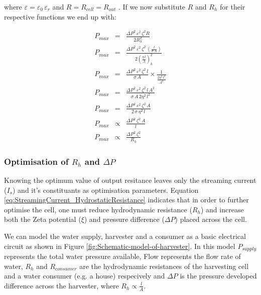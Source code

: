 where $\varepsilon=\varepsilon_{0}\,\varepsilon_{r}$ and $R=R_{cell}=R_{out}$
. If we now substitute $R$ and $R_{h}$ for their respective functions
we end up with:

\begin{eqnarray}
P_{max} & = & \frac{\Delta P^{2}\,\varepsilon^{2}\,\zeta^{2}R}{2R_{h}^{2}}\nonumber \\
P_{max} & = & \frac{\Delta P^{2}\,\varepsilon^{2}\,\zeta^{2}\,\left(\frac{l}{\sigma\, A}\right)}{2\left(\frac{\eta\, l}{A}\right)_{h}^{2}}\nonumber \\
P_{max} & = & \frac{\Delta P^{2}\,\varepsilon^{2}\,\zeta^{2}\, l}{\sigma\, A}\times\frac{1}{\frac{2\eta^{2}\, l^{2}}{A^{2}}}\nonumber \\
P_{max} & = & \frac{\Delta P^{2}\,\varepsilon^{2}\,\zeta^{2}\, l\, A^{2}}{\sigma\, A\,2\eta^{2}\, l^{2}}\nonumber \\
P_{max} & = & \frac{\Delta P^{2}\,\varepsilon^{2}\,\zeta^{2}\, A}{2\,\sigma\,\eta^{2}\, l}\nonumber \\
P_{max} & \propto & \frac{\Delta P^{2}\,\zeta^{2}\, A}{l}\nonumber \\
P_{max} & \propto & \frac{\Delta P^{2}\,\zeta^{2}}{R_{h}}
\end{eqnarray}



\subsubsection{Optimisation of $R_{h}$ and $\Delta P$}

Knowing the optimum value of output resitance leaves only the streaming
current ($I_{s}$) and it's constituants as optimisation parameters.
Equation \ref{eq:StreamingCurrent_HydrostaticResistance} indicates
that in order to further optimise the cell, one must reduce hydrodynamic
resistance ($R_{h}$) and increase both the Zeta potential ($\xi$)
and pressure difference ($\Delta P$) placed across the cell.

We can model the water supply, harvester and a consumer as a basic
electrical circuit as shown in Figure \ref{fig:Schematic-model-of-harvester}.
In this model $P_{supply}$ represents the total water pressure available,
Flow represents the flow rate of water, $R_{h}$ and $R_{consumer}$
are the hydrodynamic resistances of the harvesting cell and a water
consumer (e.g. a house) respecively and $\Delta P$ is the pressure
developed difference across the harvester, where $R_{h}\propto\frac{l}{A}$.

